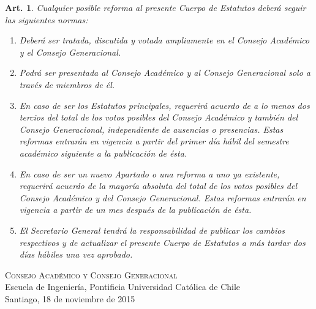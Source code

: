 \documentclass[letterpaper,11pt]{article}
\theoremstyle{plain}
\newtheorem{art}{Art.} %
\begin{document}
		\begin{art}\label{normaReforma}
			Cualquier posible reforma al presente Cuerpo de Estatutos deberá seguir las siguientes normas:
			\begin{enumerate}
				\item Deberá ser tratada, discutida y votada ampliamente en el Consejo Académico y el Consejo Generacional.
				\item  Podrá ser presentada al Consejo Académico y al Consejo Generacional solo a través de miembros de él.

				\item  En caso de ser los Estatutos principales, requerirá acuerdo de a lo menos dos tercios del total de los votos posibles del Consejo Académico y también del Consejo Generacional, independiente de ausencias o presencias. Estas reformas entrarán en vigencia a partir del primer día hábil del semestre académico siguiente a la publicación de ésta.

				\item  En caso de ser un nuevo Apartado o una reforma a uno ya existente, requerirá acuerdo de la mayoría absoluta del total de los votos posibles del Consejo Académico y del Consejo Generacional. Estas reformas entrarán en vigencia a partir de un mes después de la publicación de ésta.
				\item  El Secretario General tendrá la responsabilidad de publicar los cambios respectivos y de actualizar el presente Cuerpo de Estatutos a más tardar dos días hábiles una vez aprobado.
			\end{enumerate}
		\end{art}

	\vfill
	\textsc{Consejo Académico y Consejo Generacional}\\
	Escuela de Ingeniería, Pontificia Universidad Católica de Chile\\
	Santiago, 18 de noviembre de 2015

	\newpage
\end{document}
